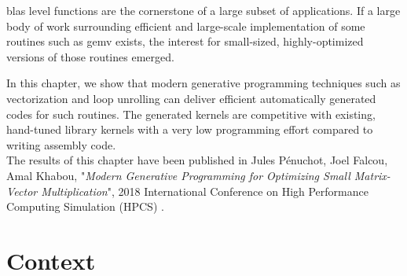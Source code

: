 \documentclass[../main]{subfiles}
\begin{document}

\gls{blas} level functions are the cornerstone of a large
subset of applications. If a large body of work surrounding
efficient and large-scale implementation of some routines such
as gemv exists, the interest for small-sized, highly-optimized
versions of those routines emerged.

In this chapter, we show that modern \cpp generative
programming techniques such as vectorization and loop unrolling
can deliver efficient automatically generated codes for such routines.
The generated kernels are competitive with existing,
hand-tuned library kernels with a very low programming effort
compared to writing assembly code.
\\

The results of this chapter have been published in
Jules P\'enuchot, Joel Falcou, Amal Khabou,
"\textit{Modern Generative Programming for Optimizing Small Matrix-Vector
Multiplication}",
2018 International Conference on High Performance Computing Simulation (HPCS)
\cite{hpcs2018-matvec}.

\section{
  Context
}
\end{document}

